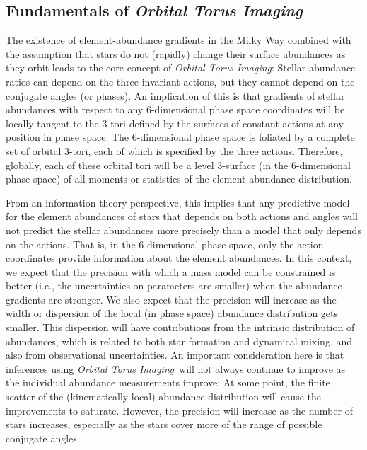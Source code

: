 \documentclass[modern]{aastex63}
\newcommand{\methodname}{\textsl{Orbital Torus Imaging}}
\begin{document}
\subsection{Fundamentals of \methodname}

The existence of element-abundance gradients in the Milky Way combined with the
assumption that stars do not (rapidly) change their surface abundances as
they orbit leads to the core concept of \methodname:
Stellar abundance ratios can depend on the three invariant actions, but they
cannot depend on the conjugate angles (or phases).
An implication of this is that gradients of stellar abundances with respect to
any 6-dimensional phase space coordinates will be locally tangent to the 3-tori
defined by the surfaces of constant actions at any position in phase space.
The 6-dimensional phase space is foliated by a complete set of orbital
3-tori, each of which is specified by the three actions.
Therefore, globally, each of these orbital tori will be a level 3-surface (in
the 6-dimensional phase space) of all moments or statistics of the
element-abundance distribution.

From an information theory perspective, this implies that any predictive model
for the element abundances of stars that depends on both actions and angles will
not predict the stellar abundances more precisely than a model that only depends
on the actions.
That is, in the 6-dimensional phase space, only the action coordinates provide
information about the element abundances.
In this context, we expect that the precision with which a mass model can be
constrained is better (i.e., the uncertainties on parameters are smaller) when
the abundance gradients are stronger.
We also expect that the precision will increase as the width or dispersion of
the local (in phase space) abundance distribution gets smaller.
This dispersion will have contributions from the intrinsic distribution of
abundances, which is related to both star formation and dynamical mixing, and
also from observational uncertainties.
An important consideration here is that inferences using \methodname\ will not
always continue to improve as the individual abundance measurements improve:
At some point, the finite scatter of the (kinematically-local) abundance
distribution will cause the improvements to saturate.
However, the precision will increase as the number of stars increases,
especially as the stars cover more of the range of possible conjugate angles.
\end{document}
